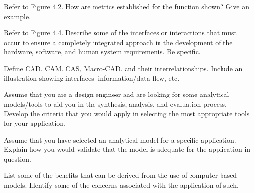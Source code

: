 \begin{exercises}
    \begin{exercise}
    \label{sea-4-13}
        Refer to Figure 4.2. How are metrics established for the function shown? Give an example.
    \end{exercise}
    \begin{solution}
    \end{solution}
    
    \begin{exercise}
    \label{sea-4-14}
        Refer to Figure 4.4. Describe some of the interfaces or interactions that must occur to ensure a completely integrated approach in the development of the hardware, software, and human system requirements. Be specific.
    \end{exercise}
    \begin{solution}
    \end{solution}
    
    \begin{exercise}
    \label{sea-4-15}
        Define CAD, CAM, CAS, Macro-CAD, and their interrelationships. Include an illustration showing interfaces, information/data flow, etc.
    \end{exercise}
    \begin{solution}
    \end{solution}
    
    \begin{exercise}
    \label{sea-4-16}
        Assume that you are a design engineer and are looking for some analytical models/tools to aid you in the synthesis, analysis, and evaluation process. Develop the criteria that you would apply in selecting the most appropriate tools for your application.
    \end{exercise}
    \begin{solution}
    \end{solution}
    
    \begin{exercise}
    \label{sea-4-17}
        Assume that you have selected an analytical model for a specific application. Explain how you would validate that the model is adequate for the application in question.
    \end{exercise}
    \begin{solution}
    \end{solution}
    
    \begin{exercise}
    \label{sea-4-19}
        List some of the benefits that can be derived from the use of computer-based models. Identify some of the concerns associated with the application of such.
    \end{exercise}
    \begin{solution}
    \end{solution}
    

\end{exercises}

